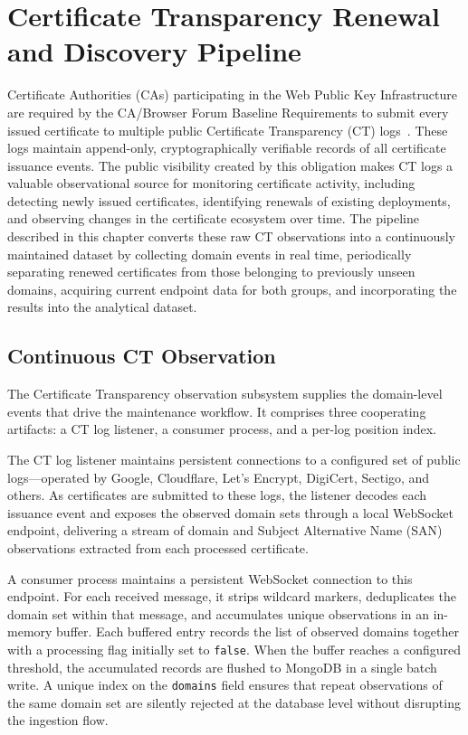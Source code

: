 
\chapter{Certificate Transparency Renewal and Discovery Pipeline}
\label{chap:ct-renewal-pipeline}

Certificate Authorities (CAs) participating in the Web Public Key
Infrastructure are required by the CA/Browser Forum Baseline Requirements to
submit every issued certificate to multiple public Certificate Transparency
(CT) logs~\cite{rfc9162}. These logs maintain append-only, cryptographically
verifiable records of all certificate issuance events. The public visibility
created by this obligation makes CT logs a valuable observational source for
monitoring certificate activity, including detecting newly issued certificates,
identifying renewals of existing deployments, and observing changes in the
certificate ecosystem over time. The pipeline described in this chapter
converts these raw CT observations into a continuously maintained dataset by
collecting domain events in real time, periodically separating renewed
certificates from those belonging to previously unseen domains, acquiring
current endpoint data for both groups, and incorporating the results into the
analytical dataset.

\section{Continuous CT Observation}
\label{sec:ct-collection-configuration}

The Certificate Transparency observation subsystem supplies the domain-level
events that drive the maintenance workflow. It comprises three cooperating
artifacts: a CT log listener, a consumer process, and a per-log position
index.

The CT log listener maintains persistent connections to a configured set of
public logs---operated by Google, Cloudflare, Let's Encrypt, DigiCert,
Sectigo, and others. As certificates are submitted to these logs, the
listener decodes each issuance event and exposes the observed domain sets
through a local WebSocket endpoint, delivering a stream of domain and Subject
Alternative Name (SAN) observations extracted from each processed
certificate.

A consumer process maintains a persistent WebSocket connection to this
endpoint. For each received message, it strips wildcard markers,
deduplicates the domain set within that message, and accumulates unique
observations in an in-memory buffer. Each buffered entry records the list of
observed domains together with a processing flag initially set to
\texttt{false}. When the buffer reaches a configured threshold, the
accumulated records are flushed to MongoDB in a single batch write. A unique
index on the \texttt{domains} field ensures that repeat observations of the
same domain set are silently rejected at the database level without
disrupting the ingestion flow.

